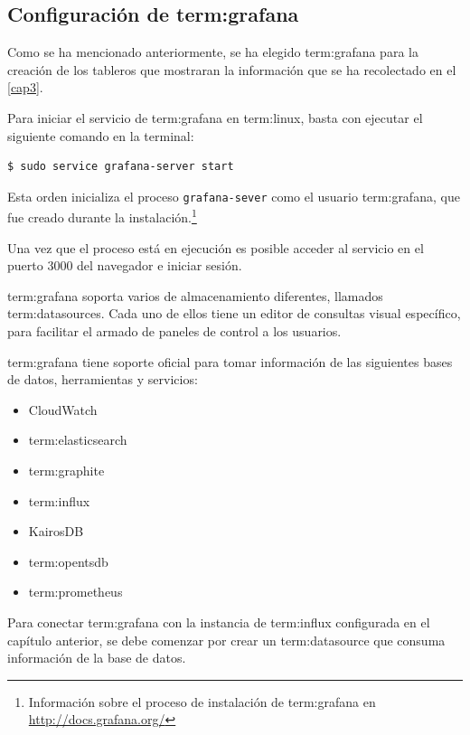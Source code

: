 \subsection{Configuración de \gls{term:grafana}}
\label{configuracion-de-grafana}

Como se ha mencionado anteriormente, se ha elegido \gls{term:grafana} para la
creación de los tableros que mostraran la información que se ha recolectado en
el \autoref{cap3}.

Para iniciar el servicio de \gls{term:grafana} en \gls{term:linux}, basta con
ejecutar el siguiente comando en la terminal:

\begin{lstlisting}
$ sudo service grafana-server start
\end{lstlisting}

Esta orden inicializa el proceso \texttt{grafana-sever} como el usuario
\gls{term:grafana}, que fue creado durante la instalación.\footnote{
Información sobre el proceso de instalación de \gls{term:grafana} en
\url{http://docs.grafana.org/}}

Una vez que el proceso está en ejecución es posible acceder al servicio en el
puerto 3000 del navegador e iniciar sesión.

\gls{term:grafana} soporta varios  de almacenamiento diferentes,
llamados \glspl{term:datasource}. Cada uno de ellos tiene un editor de consultas
visual específico, para facilitar el armado de paneles de control a los
usuarios.

\gls{term:grafana} tiene soporte oficial para tomar información de las
siguientes bases de datos, herramientas y servicios:

\begin{itemize}
  \item CloudWatch
  \item \gls{term:elasticsearch}
  \item \gls{term:graphite}
  \item \gls{term:influx}
  \item KairosDB
  \item \gls{term:opentsdb}
  \item \gls{term:prometheus}
\end{itemize}

Para conectar \gls{term:grafana} con la instancia de \gls{term:influx}
configurada en el capítulo anterior, se debe comenzar por crear un \gls{term:datasource}
que consuma información de la base de datos.

